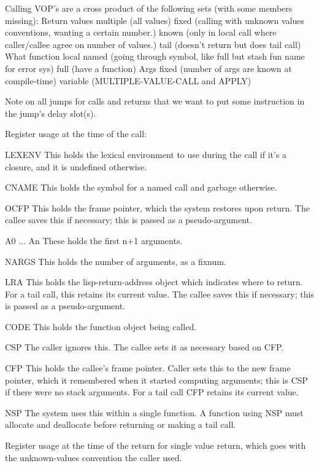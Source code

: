 Calling VOP's are a cross product of the following sets (with some members
missing):
   Return values
      multiple (all values)
      fixed (calling with unknown values conventions, wanting a certain
             number.)
      known (only in local call where caller/callee agree on number of
      	     values.)
      tail (doesn't return but does tail call)
   What function
      local
      named (going through symbol, like full but stash fun name for error sys)
      full (have a function)
   Args
      fixed (number of args are known at compile-time)
      variable (MULTIPLE-VALUE-CALL and APPLY)

Note on all jumps for calls and returns that we want to put some instruction
in the jump's delay slot(s).

Register usage at the time of the call:

LEXENV
   This holds the lexical environment to use during the call if it's a closure,
   and it is undefined otherwise.

CNAME
   This holds the symbol for a named call and garbage otherwise.

OCFP
   This holds the frame pointer, which the system restores upon return.  The
   callee saves this if necessary; this is passed as a pseudo-argument.

A0 ... An
   These holds the first n+1 arguments.

NARGS
   This holds the number of arguments, as a fixnum.

LRA
   This holds the lisp-return-address object which indicates where to return.
   For a tail call, this retains its current value.  The callee saves this
   if necessary; this is passed as a pseudo-argument.

CODE
   This holds the function object being called.

CSP
   The caller ignores this.  The callee sets it as necessary based on CFP.

CFP
   This holds the callee's frame pointer.  Caller sets this to the new frame
   pointer, which it remembered when it started computing arguments; this is
   CSP if there were no stack arguments.  For a tail call CFP retains its
   current value.

NSP
   The system uses this within a single function.  A function using NSP must
   allocate and deallocate before returning or making a tail call.

Register usage at the time of the return for single value return, which
goes with the unknown-values convention the caller used.

